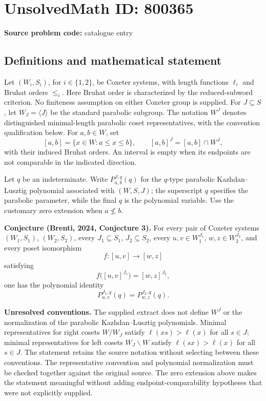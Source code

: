 \documentclass[11pt]{article}
\begin{document}
\section*{UnsolvedMath ID: 800365}
\textbf{Source problem code:} catalogue entry
\subsection{Definitions and mathematical statement}
Let \((W_i,S_i)\), for \(i\in\{1,2\}\), be Coxeter systems, with length functions \(\ell_i\) and Bruhat orders \(\le_i\). Here Bruhat order is characterized by the reduced-subword criterion. No finiteness assumption on either Coxeter group is supplied. For \(J\subseteq S\), let \(W_J=\langle J\rangle\) be the standard parabolic subgroup. The notation \(W^J\) denotes distinguished minimal-length parabolic coset representatives, with the convention qualification below. For \(a,b\in W\), set
\[
[a,b]=\{x\in W:a\le x\le b\},\qquad [a,b]^J=[a,b]\cap W^J,
\]
with their induced Bruhat orders. An interval is empty when its endpoints are not comparable in the indicated direction.

Let \(q\) be an indeterminate. Write \(P_{a,b}^{J,q}(q)\) for the \(q\)-type parabolic Kazhdan--Lusztig polynomial associated with \((W,S,J)\); the superscript \(q\) specifies the parabolic parameter, while the final \(q\) is the polynomial variable. Use the customary zero extension when \(a\not\le b\).

\textbf{Conjecture (Brenti, 2024, Conjecture 3).} For every pair of Coxeter systems \((W_1,S_1)\), \((W_2,S_2)\), every \(J_1\subseteq S_1\), \(J_2\subseteq S_2\), every \(u,v\in W_1^{J_1}\), \(w,z\in W_2^{J_2}\), and every poset isomorphism
\[
f:[u,v]\longrightarrow[w,z]
\]
satisfying
\[
f\bigl([u,v]^{J_1}\bigr)=[w,z]^{J_2},
\]
one has the polynomial identity
\[
P_{u,v}^{J_1,q}(q)=P_{w,z}^{J_2,q}(q).
\]

\textbf{Unresolved conventions.} The supplied extract does not define \(W^J\) or the normalization of the parabolic Kazhdan--Lusztig polynomials. Minimal representatives for right cosets \(W/W_J\) satisfy \(\ell(xs)>\ell(x)\) for all \(s\in J\); minimal representatives for left cosets \(W_J\backslash W\) satisfy \(\ell(sx)>\ell(x)\) for all \(s\in J\). The statement retains the source notation without selecting between these conventions. The representative convention and polynomial normalization must be checked together against the original source. The zero extension above makes the statement meaningful without adding endpoint-comparability hypotheses that were not explicitly supplied.
\end{document}
